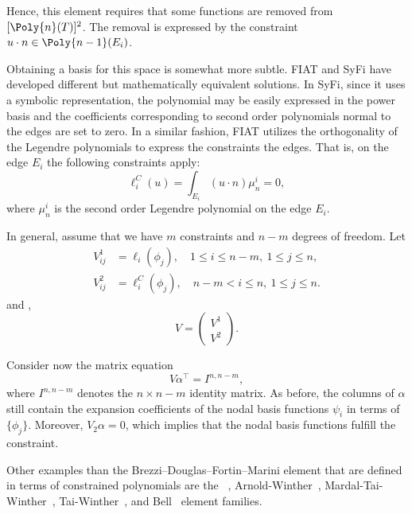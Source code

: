 Hence, this element requires that some functions are removed from
$[\Poly{n}(T)]^2$. The removal is expressed by the constraint $u \cdot n
\in \Poly{n-1}(E_i)$.

Obtaining a basis for this space is somewhat more subtle.  FIAT and
SyFi have developed different but mathematically equivalent solutions.
In SyFi, since it uses a symbolic representation, the polynomial may be
easily expressed in the power basis and the coefficients corresponding to
second order polynomials normal to the edges are set to zero. In a similar
fashion, FIAT utilizes the orthogonality of the Legendre polynomials
to express the constraints the edges. That is, on the edge $E_i$
the following constraints apply:
\begin{equation}
\ell^C_i( u ) = \int_{E_i} (u \cdot n) \mu_n^i = 0,
\end{equation}
where $\mu_n^i$ is the second order Legendre polynomial on the edge $E_i$.

In general, assume that we have $m$ constraints and $n-m$ degrees
of freedom.  Let
\begin{align}
V^1_{ij} &= \ell_i( \phi_j ), \quad  1\le i \le n-m, \  1\le j \le n,  \\
V^2_{ij} &= \ell^C_i( \phi_j ), \quad  n-m  < i \le n, \  1\le j \le n.
\end{align}
and
,
\begin{equation}
V = \left( \begin{array}{c} V^1 \\ V^2 \end{array} \right).
\end{equation}

Consider now the matrix equation
\begin{equation}
\label{eq:extendedvdmsystem}
V \alpha^{\top} = I^{n,n-m},
\end{equation}
where $I^{n,n-m}$ denotes the $n \times n-m$ identity matrix.
As before, the columns of $\alpha$ still contain the expansion coefficients
of the nodal basis functions $\psi_i$ in terms of $\{ \phi_j \}$.
Moreover, $V_2 \alpha = 0$, which implies that the nodal basis functions
fulfill the constraint.

Other examples than the Brezzi--Douglas--Fortin--Marini element
that are defined in terms of constrained polynomials are the
\nedelec~\citep{Nedelec1980}, Arnold-Winther~\citep{ArnoldWinther2002},
Mardal-Tai-Winther~\citep{MardalTaiWinther2002},
Tai-Winther~\citep{TaiWinther2006}, and Bell~\citep{Ciarlet2002}
element families.

